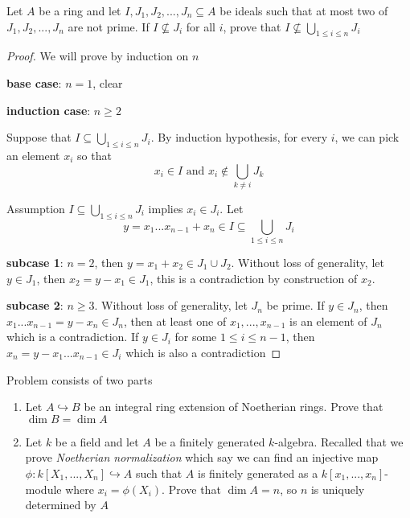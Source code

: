 \begin{problem}
	Let $A$ be a ring and let $I, J_1, J_2, ..., J_n \subseteq A$ be ideals such that at most two of $J_1, J_2, ..., J_n$ are not prime. If $I \nsubseteq J_i$ for all $i$, prove that $I \nsubseteq \bigcup_{1 \leq i \leq n} J_i$
\end{problem}

\begin{proof}
	We will prove by induction on $n$
	
	\textbf{base case}: $n = 1$, clear
	
	\textbf{induction case}: $n \geq 2$
	
	Suppose that $I \subseteq \bigcup_{1 \leq i \leq n} J_i$. By induction hypothesis, for every $i$, we can pick an element $x_i$ so that
	$$
		x_i \in I \text{ and } x_i \notin \bigcup_{k \neq i} J_k
	$$
	
	Assumption $I \subseteq \bigcup_{1 \leq i \leq n} J_i$ implies $x_i \in J_i$. Let
	$$
		y = x_1 ... x_{n-1} + x_n \in I \subseteq \bigcup_{1 \leq i \leq n} J_i
	$$
	
	\textbf{subcase 1}: $n = 2$, then $y = x_1 + x_2 \in J_1 \cup J_2$. Without loss of generality, let $y \in J_1$, then $x_2 = y - x_1 \in J_1$, this is a contradiction by construction of $x_2$.
	
	\textbf{subcase 2}: $n \geq 3$. Without loss of generality, let $J_n$ be prime. If $y \in J_n$, then $x_1 ... x_{n-1} = y - x_n \in J_n$, then at least one of $x_1, ..., x_{n-1}$ is an element of $J_n$ which is a contradiction. If $y \in J_i$ for some $1 \leq i \leq n-1$, then $x_n = y - x_1 ... x_{n-1} \in J_i$ which is also a contradiction
\end{proof}

\begin{problem}
	\label{problem2}
	Problem consists of two parts
	\begin{enumerate}
		\item Let $A \hookrightarrow B$ be an integral ring extension of Noetherian rings. Prove that $\dim B = \dim A$
		
		\item Let $k$ be a field and let $A$ be a finitely generated $k$-algebra. Recalled that we prove \textit{Noetherian normalization} which say we can find an injective map $\phi: k[X_1, ..., X_n] \hookrightarrow A$ such that $A$ is finitely generated as a $k[x_1, ..., x_n]$-module where $x_i = \phi(X_i)$. Prove that $\dim A = n$, so $n$ is uniquely determined by $A$
	\end{enumerate}
\end{problem}

